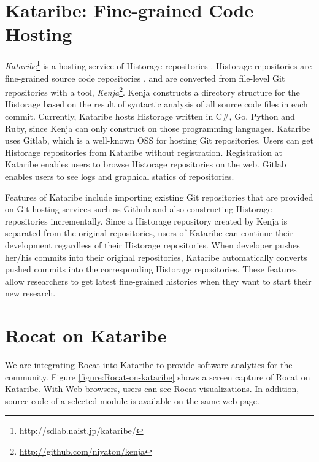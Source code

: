 \documentclass[conference]{IEEEtran}
\newcommand{\figref}[1]{Figure \ref{#1}}
\begin{document}
\section{Kataribe: Fine-grained Code Hosting}
\textit{Kataribe}\footnote{http://sdlab.naist.jp/kataribe/} is a hosting service of Historage repositories \cite{Fujiwara:2014:KHS:2597073.2597125}.
Historage repositories are fine-grained source code repositories \cite{Hata:2011:HFV:2024445.2024463}, and are converted from file-level Git repositories with a tool, \textit{Kenja}\footnote{\url{http://github.com/niyaton/kenja}}.
Kenja constructs a directory structure for the Historage based on the result of syntactic analysis of all source code files in each commit.
Currently, Kataribe hosts Historage written in C\#, Go, Python and Ruby, since Kenja can only construct on those programming languages.
Kataribe uses Gitlab, which is a well-known OSS for hosting Git repositories.
Users can get Historage repositories from Kataribe without registration.
Registration at Kataribe enables users to browse Historage repositories on the web.
Gitlab enables users to see logs and graphical statics of repositories.

Features of Kataribe include importing existing Git repositories that are provided on Git hosting services such as Github and also constructing Historage repositories incrementally.
Since a Historage repository created by Kenja is separated from the original repositories, users of Kataribe can continue their development regardless of their Historage repositories.
When developer pushes her/his commits into their original repositories, Kataribe automatically converts pushed commits into the corresponding Historage repositories.
These features allow researchers to get latest fine-grained histories when they want to start their new research.

\section{Rocat on Kataribe}
We are integrating Rocat into Kataribe to provide software analytics for the community.
\figref{figure:Rocat-on-kataribe} shows a screen capture of Rocat on Kataribe.
With Web browsers, users can see Rocat visualizations. In addition, source code of a selected module is available on the same web page.
\end{document}
